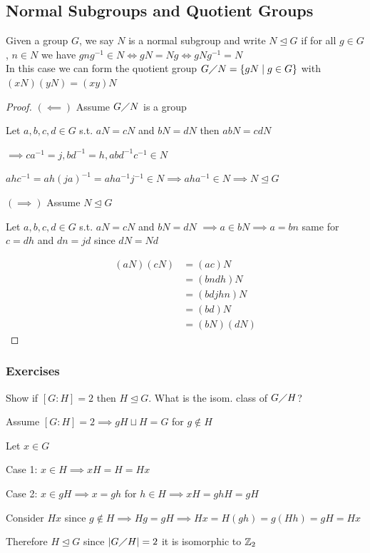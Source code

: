 \subsection{Normal Subgroups and Quotient Groups}

\begin{definition}
    Given a group $G$, we say $N$ is a normal subgroup and write
    $N \unlhd G$ if for all $g \in G$, $n \in N$ we have $gng^{-1}\in N \iff gN=Ng \iff gNg^{-1}=N$\\
    In this case we can form the quotient group $G\diagup N = \left\{ gN \mid g \in G \right\}$ with $(xN)(yN)=(xy)N$
\end{definition}

\begin{proof}
    \((\impliedby)\) Assume $G\diagup N$ is a group

    Let $a,b,c,d \in G$ s.t. $aN=cN$ and $bN=dN$ then $abN=cdN$

    $\implies ca^{-1}=j,bd^{-1}=h,abd^{-1}c^{-1}\in N$

    $ahc^{-1}=ah(ja)^{-1}=aha^{-1}j^{-1}\in N \implies aha^{-1}\in N \implies N \unlhd G$

    $(\implies)$ Assume $N \unlhd G$

    Let $a,b,c,d \in G$ s.t. $aN=cN$ and $bN=dN$ $\implies a\in bN \implies a=bn$ same for $c=dh$ and $dn=jd$ since $dN=Nd$

    \begin{align*}
        (aN)(cN)&=(ac)N\\
            &=(bndh)N\\
            &=(bdjhn)N\\
            &=(bd)N\\
            &=(bN)(dN)
    \end{align*}
\end{proof}

\newpage
\subsubsection{Exercises}
\begin{example}
    Show if $[G:H]=2$ then $H \unlhd G$. What is the isom. class of $G\diagup H$?

    Assume $[G:H]=2 \implies gH \sqcup H = G$ for $g \notin H$

    Let $x \in G$

    Case 1: $x \in H \implies xH=H=Hx$

    Case 2: $x \in gH \implies x=gh$ for $h \in H \implies xH=ghH=gH$

    Consider $Hx$ since $g \notin H \implies Hg=gH \implies Hx=H(gh)=g(Hh)=gH=Hx$

    Therefore $H \unlhd G$ since $|G\diagup H|=2$ it is isomorphic to $\mathbb{Z}_2$
\end{example}

